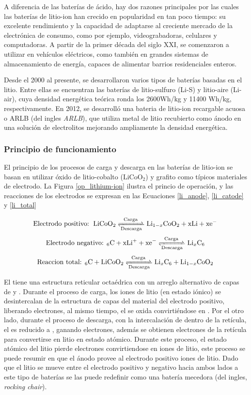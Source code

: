 \documentclass[10pt,a4paper]{article}
\newcommand\reaction[1]{\begin{equation}\ce{#1}\end{equation}}
\begin{document}
\noindent A diferencia de las baterías de ácido, hay dos razones principales por
las cuales las baterías de litio-ion han crecido en popularidad en tan poco
tiempo: su excelente rendimiento y la capacidad de adaptarse al creciente
mercado de la electrónica de consumo, como por ejemplo, videograbadoras,
celulares y computadoras. A partir de la primer década del siglo XXI, se
comenzaron a utilizar en vehículos eléctricos, como también en grandes sistemas
de almacenamiento de energía, capaces de alimentar barrios residenciales
enteros.

\noindent Desde el 2000 al presente, se desarrollaron varios tipos de 
bater\'ias basadas en el litio. Entre ellas se encuentran las bater\'ias de 
litio-sulfuro (Li-S) y litio-aire (Li-air), cuya densidad energética teórica 
ronda los 2600Wh/kg y 11400 Wh/kg, respectivamente. En 2012, se desarrolló una 
bateria de litio-ion recargable acuosa o \acrshort{ARLB} (del ingles
\emph{\acrlong{ARLB}}), que utiliza metal de litio recubierto como ánodo en una
solución de electrolitos mejorando ampliamente la densidad energética.

\subsubsection{Principio de funcionamiento}\label{battery_fun}

El principio de los procesos de carga y descarga en las baterías de litio-ion se
basan en utilizar óxido de litio-cobalto ($\mathrm{LiCoO_2}$) y grafito como
típicos materiales de electrodo. La Figura \ref{op_lithium-ion} ilustra el
princio de operación, y las reacciones de los electrodos se expresan en  las
Ecuaciones \ref{li_anode}, \ref{li_catode} y \ref{li_total}

\reaction{\text{Electrodo positivo: } LiCoO2 <=>[Carga][Descarga] Li_{1-x}CoO2 + xLi + xe^- \label{li_anode}}
\reaction{\text{Electrodo negativo: }6C + xLi^+ + xe^- <=>[Carga][Descarga] Li_{x}C6 \label{li_catode}}
\reaction{\text{Reaccion total: }6C + LiCoO2 <=>[Carga][Descarga] Li_{x}C6 + Li_{1-x}CoO2 \label{li_total}}

\noindent El  tiene una estructura reticular octa\'edrica con un
arreglo alternativo de capas de  y . Durante el proceso de
carga, los iones de litio (en estado iónico) se desintercalan de la estructura
de capas del material del electrodo positivo, liberando electrones, al mismo
tiempo, el  se oxida convirti\'endose en .  Por el otro
lado, durante el proceso de descarga, con la intercalación de  dentro de
la ret\'icula, el  es reducido a , ganando electrones,
adem\'as se obtienen electrones de la ret\'icula para convertirse en litio en 
estado atómico. Durante este proceso, el estado atómico del litio pierde 
electrones convirtiendose en iones de litio, este proceso se puede resumir en 
que el ánodo provee al electrodo positivo iones de litio. Dado que el litio se 
mueve entre el electrodo positivo y negativo hacia ambos lados a este tipo de 
baterías se las puede redefinir como una batería mecedora (del ingles,
\emph{rocking chair}).
\end{document}
